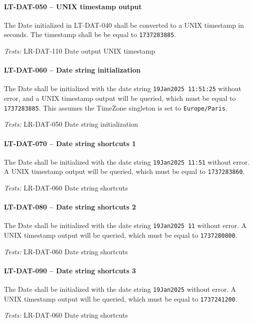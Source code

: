 \paragraph{LT-DAT-050 -- UNIX timestamp output}
The Date initialized in LT-DAT-040 shall be converted to a UNIX
timestamp in seconds. The timestamp shall be be equal to \lstinline{1737283885}.

\textit{Tests: } LR-DAT-110 Date output UNIX timestamp

\paragraph{LT-DAT-060 -- Date string initialization}
The Date shall be initialized with the date string
\lstinline{19Jan2025 11:51:25} without error, and a UNIX timestamp output
will be queried, which must be equal to \lstinline{1737283885}.
This assumes the TimeZone singleton is set to \lstinline{Europe/Paris}.

\textit{Tests: } LR-DAT-050 Date string initialization

\paragraph{LT-DAT-070 -- Date string shortcuts 1}
The Date shall be initialized with the date string
\lstinline{19Jan2025 11:51} without error.
A UNIX timestamp output will be queried, which must be equal to
\lstinline{1737283860}.

\textit{Tests: } LR-DAT-060 Date string shortcuts

\paragraph{LT-DAT-080 -- Date string shortcuts 2}
The Date shall be initialized with the date string
\lstinline{19Jan2025 11} without error.
A UNIX timestamp output will be queried, which must be equal to
\lstinline{1737280800}.

\textit{Tests: } LR-DAT-060 Date string shortcuts

\paragraph{LT-DAT-090 -- Date string shortcuts 3}
The Date shall be initialized with the date string
\lstinline{19Jan2025} without error.
A UNIX timestamp output will be queried, which must be equal to
\lstinline{1737241200}.

\textit{Tests: } LR-DAT-060 Date string shortcuts

